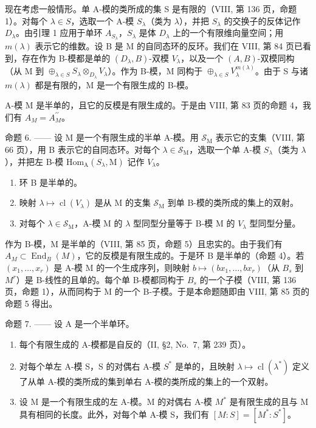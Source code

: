 现在考虑一般情形。单 A-模的类所成的集 S 是有限的（VIII, 第 136 页，命题 1）。对每个 \(\lambda \in S\)，选取一个 A-模 \(S_{\lambda}\)（类为 \(\lambda\)），并把 \(S_{\lambda}\) 的交换子的反体记作 \(D_{\lambda}\)。由引理 1 应用于单环 \(A_{S_{\lambda}}\)，\(S_{\lambda}\) 是体 \(D_{\lambda}\) 上的一个有限维向量空间；用 \(m(\lambda)\) 表示它的维数。设 B 是 M 的自同态环的反环。我们在 VIII, 第 84 页已看到，存在作为 B-模都是单的 \((D_{\lambda}, B)\)-双模 \(V_{\lambda}\)，以及一个 \((A, B)\)-双模同构（从 M 到 \(\oplus_{\lambda \in S} S_{\lambda} \otimes_{D_{\lambda}} V_{\lambda}\)）。作为 B-模，M 同构于 \(\oplus_{\lambda \in S} V_{\lambda}^{m(\lambda)}\)。由于 S 与诸 \(m(\lambda)\) 都是有限的，M 是一个有限生成的 B-模。

A-模 M 是半单的，且它的反模是有限生成的。于是由 VIII, 第 83 页的命题 4，我们有 \(A_{M} = A_{M}^{\prime\prime}\)。

命题 6. —— 设 M 是一个有限生成的半单 A-模。用 \(\mathcal{S}_{\mathrm{M}}\) 表示它的支集（VIII, 第 66 页），用 B 表示它的自同态环。对每个 \(\lambda \in \mathcal{S}_{\mathrm{M}}\)，选取一个单 A-模 \(S_{\lambda}\)（类为 \(\lambda\)），并把左 B-模 \(\mathrm{Hom}_{\mathrm{A}}(S_{\lambda}, \mathrm{M})\) 记作 \(V_{\lambda}\)。

\begin{enumerate}
\def\labelenumi{\alph{enumi})}
\item
  环 B 是半单的。
\item
  映射 \(\lambda \mapsto \operatorname{cl}(V_{\lambda})\) 是从 M 的支集 \(\mathcal{S}_{\mathrm{M}}\) 到单 B-模的类所成的集上的双射。
\item
  对每个 \(\lambda \in \mathcal{S}_{\mathrm{M}}\)，A-模 M 的 \(\lambda\) 型同型分量等于 B-模 M 的 \(V_{\lambda}\) 型同型分量。
\end{enumerate}

作为 B-模，M 是半单的（VIII, 第 85 页，命题 5）且忠实的。由于我们有 \(A_{M} \subset \operatorname{End}_{B}(M)\)，它的反模是有限生成的。于是环 B 是半单的（命题 4）。若 \((x_{1}, \ldots, x_{r})\) 是 A-模 M 的一个生成序列，则映射 \(b \mapsto (bx_{1}, \ldots, bx_{r})\)（从 \(B_{s}\) 到 \(M^{r}\)）是 B-线性的且单的。每个单 B-模都同构于 \(B_{s}\) 的一个子模（VIII, 第 136 页，命题 1），从而同构于 M 的一个 B-子模。于是本命题随即由 VIII, 第 85 页的命题 5 得出。

命题 7. —— 设 A 是一个半单环。

\begin{enumerate}
\def\labelenumi{\alph{enumi})}
\item
  每个有限生成的 A-模都是自反的（II, §2, No.~7, 第 239 页）。
\item
  对每个单左 A-模 S，S 的对偶右 A-模 \(S^{*}\) 是单的，且映射 \(\lambda \mapsto \operatorname{cl}(\lambda^{*})\) 定义了从单 A-模的类所成的集到单右 A-模的类所成的集上的一个双射。
\item
  设 M 是一个有限生成的左 A-模。M 的对偶右 A-模 \(M^{*}\) 是有限生成的且与 M 具有相同的长度。此外，对每个单 A-模 S，我们有 \([M:S]=[M^{*}:S^{*}]\)。
\end{enumerate}

